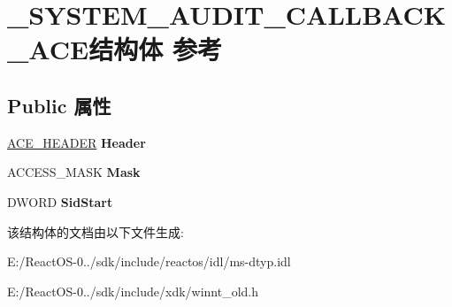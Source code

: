 \hypertarget{struct___s_y_s_t_e_m___a_u_d_i_t___c_a_l_l_b_a_c_k___a_c_e}{}\section{\+\_\+\+S\+Y\+S\+T\+E\+M\+\_\+\+A\+U\+D\+I\+T\+\_\+\+C\+A\+L\+L\+B\+A\+C\+K\+\_\+\+A\+C\+E结构体 参考}
\label{struct___s_y_s_t_e_m___a_u_d_i_t___c_a_l_l_b_a_c_k___a_c_e}
\subsection*{Public 属性}
\begin{DoxyCompactItemize}
\item 
\mbox{\label{struct___s_y_s_t_e_m___a_u_d_i_t___c_a_l_l_b_a_c_k___a_c_e_a200f02e4f34ce95a152c809c44076668}} 
\hyperlink{struct___a_c_e___h_e_a_d_e_r}{A\+C\+E\+\_\+\+H\+E\+A\+D\+ER} {\bfseries Header}
\item 
\mbox{\label{struct___s_y_s_t_e_m___a_u_d_i_t___c_a_l_l_b_a_c_k___a_c_e_a02ab1e8d8ca7c96622e10e5b315ac9a7}} 
A\+C\+C\+E\+S\+S\+\_\+\+M\+A\+SK {\bfseries Mask}
\item 
\mbox{\label{struct___s_y_s_t_e_m___a_u_d_i_t___c_a_l_l_b_a_c_k___a_c_e_ada63600c1ec249e258136fcf57eb0019}} 
D\+W\+O\+RD {\bfseries Sid\+Start}
\end{DoxyCompactItemize}


该结构体的文档由以下文件生成\+:\begin{DoxyCompactItemize}
\item 
E\+:/\+React\+O\+S-\/0../sdk/include/reactos/idl/ms-\/dtyp.\+idl\item 
E\+:/\+React\+O\+S-\/0../sdk/include/xdk/winnt\+\_\+old.\+h\end{DoxyCompactItemize}
